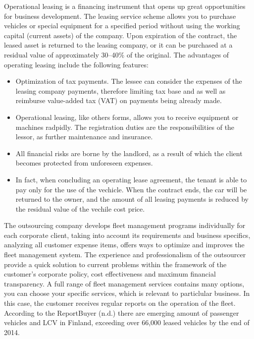 \documentclass[12pt,twoside]{reedthesis}
\begin{document}
Operational leasing is a financing instrument that opens up great opportunities for business development. The leasing service scheme allows you to purchase vehicles or special equipment for a specified period without using the working capital (current assets) of the company. Upon expiration of the contract, the leased asset is returned to the leasing company, or it can be purchased at a residual value of approximately 30--40\% of the original. The advantages of operating leasing include the following features:
\begin{itemize}
\item
  Optimization of tax payments. The lessee can consider the expenses of the leasing company payments, therefore limiting tax base and as well as reimburse value-added tax (VAT) on payments being already made.
\item
  Operational leasing, like others forms, allows you to receive equipment or machines radpidly. The registration duties are the responsibilities of the lessor, as further maintenance and insurance.
\item
  All financial risks are borne by the landlord, as a result of which the client becomes protected from unforeseen expenses.
\item
  In fact, when concluding an operating lease agreement, the tenant is able to pay only for the use of the vechicle. When the contract ends, the car will be returned to the owner, and the amount of all leasing payments is reduced by the residual value of the vechile cost price.
\end{itemize}
The outsourcing company develops fleet management programs individually for each corporate client, taking into account its requirements and business specifics, analyzing all customer expense items, offers ways to optimize and improves the fleet management system. The experience and professionalism of the outsourcer provide a quick solution to current problems within the framework of the customer's corporate policy, cost effectiveness and maximum financial transparency. A full range of fleet management services contains many options, you can choose your specific services, which is relevant to particlular business. In this case, the customer receives regular reports on the operation of the fleet. According to the ReportBuyer (n.d.) there are emerging amount of passenger vehicles and LCV in Finland, exceeding over 66,000 leased vehicles by the end of 2014.
\end{document}

